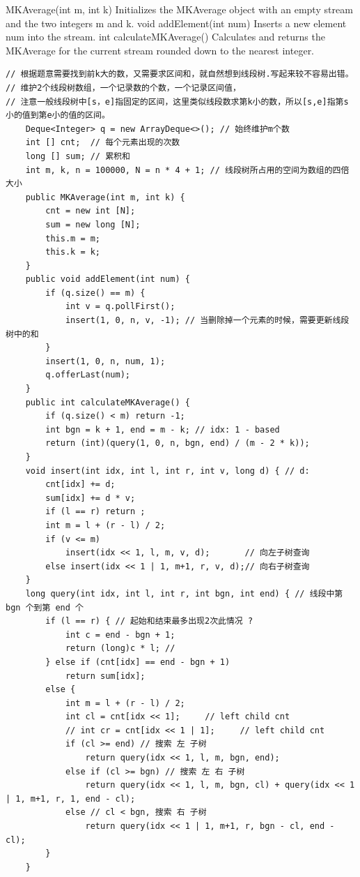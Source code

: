\documentclass[9pt, b5paaper]{book}
\begin{document}
MKAverage(int m, int k) Initializes the MKAverage object with an empty stream and the two integers m and k.
void addElement(int num) Inserts a new element num into the stream.
int calculateMKAverage() Calculates and returns the MKAverage for the current stream rounded down to the nearest integer.
\begin{verbatim}
// 根据题意需要找到前k大的数，又需要求区间和，就自然想到线段树.写起来较不容易出错。
// 维护2个线段树数组，一个记录数的个数，一个记录区间值，
// 注意一般线段树中[s，e]指固定的区间，这里类似线段数求第k小的数，所以[s,e]指第s小的值到第e小的值的区间。
    Deque<Integer> q = new ArrayDeque<>(); // 始终维护m个数
    int [] cnt;  // 每个元素出现的次数
    long [] sum; // 累积和
    int m, k, n = 100000, N = n * 4 + 1; // 线段树所占用的空间为数组的四倍大小
    public MKAverage(int m, int k) {
        cnt = new int [N];
        sum = new long [N];
        this.m = m;
        this.k = k;
    }
    public void addElement(int num) {
        if (q.size() == m) {
            int v = q.pollFirst();
            insert(1, 0, n, v, -1); // 当删除掉一个元素的时候，需要更新线段树中的和
        }
        insert(1, 0, n, num, 1);
        q.offerLast(num);
    }
    public int calculateMKAverage() {
        if (q.size() < m) return -1;
        int bgn = k + 1, end = m - k; // idx: 1 - based
        return (int)(query(1, 0, n, bgn, end) / (m - 2 * k));
    }
    void insert(int idx, int l, int r, int v, long d) { // d: 
        cnt[idx] += d;
        sum[idx] += d * v;
        if (l == r) return ;
        int m = l + (r - l) / 2;
        if (v <= m)
            insert(idx << 1, l, m, v, d);       // 向左子树查询
        else insert(idx << 1 | 1, m+1, r, v, d);// 向右子树查询
    }
    long query(int idx, int l, int r, int bgn, int end) { // 线段中第 bgn 个到第 end 个
        if (l == r) { // 起始和结束最多出现2次此情况 ?
            int c = end - bgn + 1;
            return (long)c * l; //
        } else if (cnt[idx] == end - bgn + 1)
            return sum[idx];
        else {
            int m = l + (r - l) / 2;
            int cl = cnt[idx << 1];     // left child cnt
            // int cr = cnt[idx << 1 | 1];     // left child cnt
            if (cl >= end) // 搜索 左 子树
                return query(idx << 1, l, m, bgn, end); 
            else if (cl >= bgn) // 搜索 左 右 子树
                return query(idx << 1, l, m, bgn, cl) + query(idx << 1 | 1, m+1, r, 1, end - cl);
            else // cl < bgn, 搜索 右 子树
                return query(idx << 1 | 1, m+1, r, bgn - cl, end - cl);
        }
    }
\end{verbatim}
\end{document}
